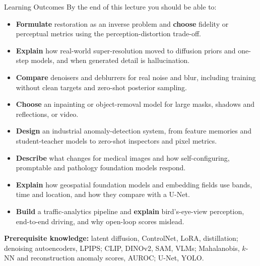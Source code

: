 \begin{frame}{Learning Outcomes}
  \setlength{\parskip}{0pt}
  By the end of this lecture you should be able to:
  \begin{itemize}\footnotesize\itemsep0.1em
    \item \textbf{Formulate} restoration as an inverse problem and \textbf{choose} fidelity or perceptual metrics using the perception-distortion trade-off.
    \item \textbf{Explain} how real-world super-resolution moved to diffusion priors and one-step models, and when generated detail is hallucination.
    \item \textbf{Compare} denoisers and deblurrers for real noise and blur, including training without clean targets and zero-shot posterior sampling.
    \item \textbf{Choose} an inpainting or object-removal model for large masks, shadows and reflections, or video.
    \item \textbf{Design} an industrial anomaly-detection system, from feature memories and student-teacher models to zero-shot inspectors and pixel metrics.
    \item \textbf{Describe} what changes for medical images and how self-configuring, promptable and pathology foundation models respond.
    \item \textbf{Explain} how geospatial foundation models and embedding fields use bands, time and location, and how they compare with a U-Net.
    \item \textbf{Build} a traffic-analytics pipeline and \textbf{explain} bird's-eye-view perception, end-to-end driving, and why open-loop scores mislead.
  \end{itemize}
  \vspace{0.2em}
  {\footnotesize \textbf{Prerequisite knowledge:} latent diffusion, ControlNet, LoRA, distillation; denoising autoencoders, LPIPS; CLIP, DINOv2, SAM, VLMs; Mahalanobis, $k$-NN and reconstruction anomaly scores, AUROC; U-Net, YOLO.\par}
\end{frame}
